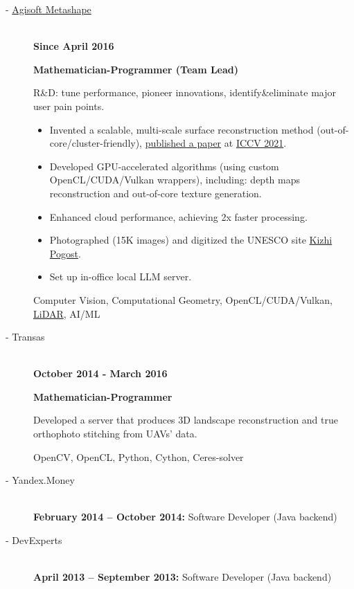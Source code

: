 \documentclass[11pt,oneside]{article}
\newcommand{\hhref}[2]{\href{#1}{\color{blue}#2}}
\begin{document}
\begin{description}
  \item[ - \hhref{https://en.wikipedia.org/wiki/PhotoScan}{Agisoft Metashape}] \hfill \\
    \textbf{Since April 2016}

    \textbf{Mathematician-Programmer (Team Lead)}

    R\&D: tune performance, pioneer innovations, identify\&eliminate major user pain points.

    \begin{itemize}

      \item Invented a scalable, multi-scale surface reconstruction method (out-of-core/cluster-friendly), \hhref{https://www.polarnick.com/static/papers/poliarnyi2021.pdf}{published a paper} at \hhref{http://iccv2021.thecvf.com/}{ICCV 2021}.
      \item Developed GPU-accelerated algorithms (using custom OpenCL/CUDA/Vulkan wrappers), including: depth maps reconstruction and out-of-core texture generation.
      \item Enhanced cloud performance, achieving 2x faster processing.
      \item Photographed (15K images) and digitized the UNESCO site \hhref{https://heritage3d.ru/models/kizhskiy-pogost}{Kizhi Pogost}.
      \item Set up in-office local LLM server.
    \end{itemize}

    Computer Vision, Computational Geometry, OpenCL/CUDA/Vulkan, \hhref{https://polarnick.com/static/presentations/AgisoftMetashapeGSW2023.pdf}{LiDAR}, AI/ML
  \item[ - Transas] \hfill \\
    \textbf{October 2014 - March 2016}

    \textbf{Mathematician-Programmer}

    Developed a server that produces 3D landscape reconstruction and true orthophoto stitching from UAVs' data.

    OpenCV, OpenCL, Python, Cython, Ceres-solver
  \item[ - Yandex.Money] \hfill \\
    \textbf{February 2014 – October 2014:} Software Developer (Java backend)
  \item[ - DevExperts] \hfill \\
    \textbf{April 2013 – September 2013:} Software Developer (Java backend)

\end{description}
\end{document}
